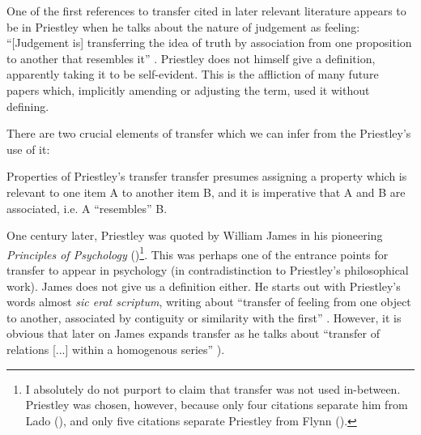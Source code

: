 \documentclass{article}
\begin{document}
One of the first references to transfer cited in later relevant literature \citep[i.e., psychology of the 1890s-1920s;][]{james_principles_1890-1} appears to be in Priestley when he talks about the nature of judgement as feeling: ``[Judgement is] transferring the idea of truth by association from one proposition to another that resembles it'' \citep[][p. 30]{priestley_hartleys_1790}. Priestley does not himself give a definition, apparently taking it to be self-evident. This is the affliction of many future papers which, implicitly amending or adjusting the term, used it without defining.

There are two crucial elements of transfer which we can infer from the Priestley’s use of it:

\pex Properties of Priestley's transfer
\a transfer presumes assigning a property which is relevant to one item A to another item B, and
\a it is imperative that A and B are associated, i.e. A ``resembles'' B.
\xe

One century later, Priestley was quoted by William James in his pioneering \textit{Principles of Psychology} (\citeyear{james_principles_1890-1})\footnote{I absolutely do not purport to claim that transfer was not used in-between. Priestley was chosen, however, because only four citations separate him from Lado (\citeyear{lado_testing_1951}), and only five citations separate Priestley from Flynn (\citeyear{flynn_microvariation_2021}).}. This was perhaps one of the entrance points for transfer to appear in psychology (in contradistinction to Priestley’s philosophical work). James does not give us a definition either. He starts out with Priestley’s words almost \textit{sic erat scriptum}, writing about ``transfer of feeling from one object to another, associated by contiguity or similarity with the first'' \citep[][p. 330]{james_principles_1890-1}. However, it is obvious that later on James expands transfer as he talks about ``transfer of relations [...] within a homogenous series'' \citep[][p. 660]{james_principles_1890}).
\end{document}
